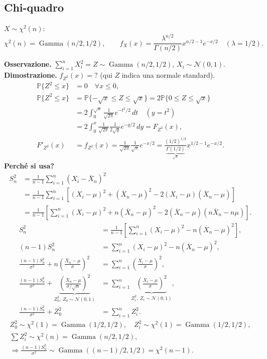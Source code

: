 \subsection*{Chi-quadro}
$X\sim\chi^2(n)$:
\[\chi^2(n)=\operatorname{Gamma}(n/2,1/2),\qquad
\boxed{f_X(x)=\frac{\lambda^{n/2}}{\Gamma(n/2)}x^{n/2-1}e^{-x/2}}\quad(\lambda=1/2).\]
\begin{center}\end{center}
\textbf{Osservazione.} $\sum_{i=1}^n X_i^2=Z\sim\operatorname{Gamma}(n/2,1/2)$, $X_i\sim\mathcal N(0,1)$.
\textbf{Dimostrazione.} $f_{Z^2}(x)=?$ (qui $Z$ indica una normale standard).
\begin{align*}
\mathbb P\{Z^2\le x\}&=0\quad\forall x\le0,\\
\mathbb P\{Z^2\le x\}&=\mathbb P\{-\sqrt x\le Z\le\sqrt x\}=2\mathbb P\{0\le Z\le\sqrt x\}\\
&=2\int_0^{\sqrt x}\frac1{\sqrt{2\pi}}e^{-t^2/2}\,dt
\quad(y=t^2)\\
&=2\int_0^x\frac1{\sqrt{2\pi}}\frac1{2\sqrt y}e^{-y/2}\,dy=F_{Z^2}(x),\\
F'_{Z^2}(x)&=f_{Z^2}(x)=\frac1{\sqrt{2\pi}}\frac1{\sqrt x}e^{-x/2}
=\frac{(1/2)^{1/2}}{\underbrace{\Gamma(1/2)}_{\sqrt\pi}}x^{1/2-1}e^{-x/2}.
\end{align*}
\textbf{Perché si usa?}
\begin{align*}
S_n^2&=\frac1{n-1}\sum_{i=1}^n(X_i-\overline X_n)^2\\
&=\frac1{n-1}\sum_{i=1}^n\left[(X_i-\mu)^2+(\overline X_n-\mu)^2-2(X_i-\mu)(\overline X_n-\mu)\right]\\
&=\frac1{n-1}\left[\sum_{i=1}^n(X_i-\mu)^2+n(\overline X_n-\mu)^2-2(\overline X_n-\mu)(n\overline X_n-n\mu)\right].
\end{align*}
\begin{align*}
S_n^2&=\frac1{n-1}\left[\sum_{i=1}^n(X_i-\mu)^2-n(\overline X_n-\mu)^2\right],\\
(n-1)S_n^2&=\sum_{i=1}^n(X_i-\mu)^2-n(\overline X_n-\mu)^2,\\
\frac{(n-1)S_n^2}{\sigma^2}+n\left(\frac{\overline X_n-\mu}{\sigma}\right)^2&=\sum_{i=1}^n\left(\frac{X_i-\mu}{\sigma}\right)^2,\\
\frac{(n-1)S_n^2}{\sigma^2}+\underbrace{\left(\frac{\overline X_n-\mu}{\sigma/\sqrt n}\right)^2}_{Z_0^2,\ Z_0\sim\mathcal N(0,1)}&=\sum_{i=1}^n\underbrace{\left(\frac{X_i-\mu}{\sigma}\right)^2}_{Z_i^2,\ Z_i\sim\mathcal N(0,1)},\\
\frac{(n-1)S_n^2}{\sigma^2}+Z_0^2&=\sum_{i=1}^n Z_i^2.
\end{align*}
\begin{gather*}
Z_0^2\sim\chi^2(1)=\operatorname{Gamma}(1/2,1/2),\quad Z_i^2\sim\chi^2(1)=\operatorname{Gamma}(1/2,1/2),\\
\sum Z_i^2\sim\chi^2(n)=\operatorname{Gamma}(n/2,1/2),\\
\Rightarrow\frac{(n-1)S_n^2}{\sigma^2}\sim\operatorname{Gamma}((n-1)/2,1/2)=\chi^2(n-1).
\end{gather*}
